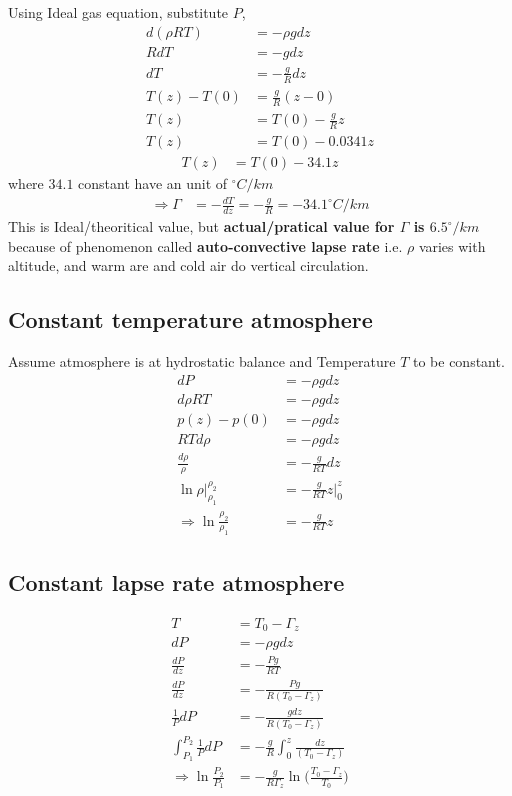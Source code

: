 \documentclass[fleqn,10pt]{SelfArx} %
\begin{document}
Using Ideal gas equation, substitute $P$,
\begin{align}
    d(\rho RT) &= -\rho gdz \\ 
    RdT &= -gdz \\ 
    dT &= -\frac{g}{R}dz \\ 
    T(z) - T(0) &= \frac{g}{R}(z-0) \\
    T(z) &= T(0) - \frac{g}{R}z \\
    T(z) &= T(0) - 0.0341z
\end{align}
\begin{align}
    T(z) &= T(0) - 34.1z
\end{align}
where $34.1$ constant have an unit of $^\circ C/km$
\begin{align}
    \Rightarrow \Gamma &= -\frac{dT}{dz} = -\frac{g}{R} = -34.1^\circ C/km 
\end{align}
This is Ideal/theoritical value, but \textbf{actual/pratical value for $\Gamma$ is $6.5^\circ/km $} because of phenomenon called \textbf{auto-convective lapse rate} i.e. $\rho$ varies with altitude, and warm are and cold air do vertical circulation.

\subsection{Constant temperature atmosphere}
Assume atmosphere is at hydrostatic balance and Temperature $T$ to be constant.
\begin{align}
    dP &= -\rho gdz \\ 
    d \rho R T &= -\rho g dz \\
    p(z)-p(0) &= -\rho gdz \\
    RTd\rho &= -\rho gdz \\
    \frac{d\rho}{\rho} &= -\frac{g}{RT}dz \\
    \ln{\rho} |^{\rho_2}_{\rho_1} &= -\frac{g}{RT}z |^{z}_{0} \\
    \Rightarrow \ln{\frac{\rho_2}{\rho_1}} &= -\frac{g}{RT}z
\end{align}

\subsection{Constant lapse rate atmosphere}
\begin{align}
    T &= T_0-\Gamma_z \\
    dP &= -\rho gdz \\ 
    \frac{dP}{dz} &= -\frac{Pg}{R T} \\ 
    \frac{dP}{dz} &= -\frac{Pg}{R (T_0-\Gamma_z)} \\ 
    \frac{1}{P}dP &= -\frac{gdz}{R (T_0-\Gamma_z)}\\ 
    \int_{P_1}^{P_2}\frac{1}{P}dP &= -\frac{g}{R} \int^z_0 \frac{dz}{(T_0-\Gamma_z)}\\ 
    \Rightarrow \ln{\frac{P_2}{P_1}} &= -\frac{g}{R\Gamma_z} \ln{\Big(\frac{T_0-\Gamma_z}{T_0}\Big)}
\end{align}
\end{document}
